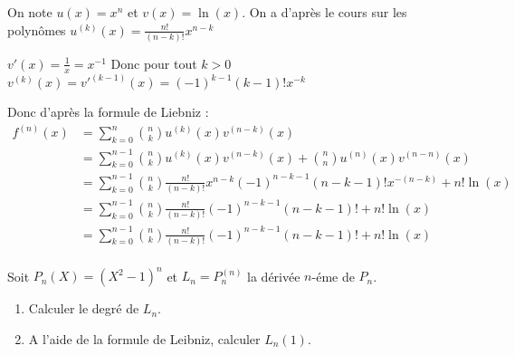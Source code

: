 \documentclass[a4paper, 11pt,reqno]{article}
\begin{document}
\begin{correction}
On note $u(x)=x^n$ et $v(x)=\ln(x)$. 
On a d'après le cours sur les polynômes $u^{(k)} (x)=\frac{n!}{(n-k)!}x^{n-k}$

$v'(x)=\frac{1}{x}=x^{-1}$
Donc pour tout $k>0$ $v^{(k)}(x)=v'^{(k-1)} (x)= (-1)^{k-1} (k-1)! x^{-k}$

 

Donc  d'après la formule de Liebniz :
\begin{align*}
f^{(n)}(x)&= \sum_{k=0}^n \binom{n}{k} u^{(k)}(x)v^{(n-k)}(x)\\
			&=  \sum_{k=0}^{n-1} \binom{n}{k} u^{(k)}(x)v^{(n-k)}(x) +\binom{n}{n} u^{(n)}(x)v^{(n-n)}(x) \\
			&= \sum_{k=0}^{n-1} \binom{n}{k} \frac{n!}{(n-k)!}x^{n-k}(-1)^{n-k-1} (n-k-1)! x^{-(n-k)}  + n!\ln(x)\\
			&=\sum_{k=0}^{n-1} \binom{n}{k} \frac{n!}{(n-k)!}(-1)^{n-k-1} (n-k-1)!  + n!\ln(x)\\
			&=\sum_{k=0}^{n-1} \binom{n}{k} \frac{n!}{(n-k)!}(-1)^{n-k-1} (n-k-1)!  + n!\ln(x)\\
\end{align*}


\end{correction}

\begin{exercice}
Soit $P_n(X) = (X^2-1)^n$ et $L_n=P_n^{(n)}$ la dérivée $n$-éme de $P_n$. 
\begin{enumerate}
\item Calculer le degré de $L_n$.
\item A l'aide de la formule de Leibniz, calculer $L_n(1)$.
\end{enumerate}
\end{exercice}
\end{document}
